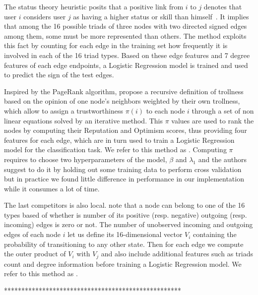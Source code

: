 The status theory heuristic posits that a positive link from $i$ to $j$ denotes
that user $i$ considers user $j$ as having a higher status or skill than
himself~\cite{Leskovec2010}. It implies that among the 16 possible triads of
three nodes with two directed signed edges among them, some must be more
represented than others. The \emph{\comptriads{}} method exploits this fact by
counting for each edge in the training set how frequently it is involved in
each of the 16 triad types. Based on these edge features and 7 degree features
of each edge endpoints, a Logistic Regression model is trained and used to
predict the sign of the test edges.

Inspired by the PageRank algorithm, \citet{wu2016troll} propose a recursive
definition of trollness based on the opinion of one node's neighbors weighted
by their own trollness, which allow to assign a trustworthiness $\pi(i)$ to
each node $i$ through a set of non linear equations solved by an iterative
method. This $\pi$ values are used to rank the nodes by computing their
Reputation and Optimism scores, thus providing four features for each edge,
which are in turn used to train a Logistic Regression model for the
classification task. We refer to this method as \emph{\compranknodes{}}.
Computing $\pi$ requires to choose two hyperparameters of the model, $\beta$
and $\lambda_1$ and the authors suggest to do it by holding out some training
data to perform cross validation but in practice we found little difference in
performance in our implementation while it consumes a lot of time.

The last competitors is also local. \citet{Bayesian15} note that  a node can
belong to one of the 16 types based of whether is number of its positive (resp.
negative) outgoing (resp. incoming) edges is zero or not.  The number of
unobserved incoming and outgoing edges of each node $i$ let us define its
16-dimensional vector $V_i$ containing the probability of transitioning to any
other state.  Then for each edge \eij we compute the outer product of $V_i$
with $V_j$ and also include additional features such as triads count and degree
information before training a Logistic Regression model. We refer to this
method as \emph{\compbayesian{}}.

***************************************************
\fi








